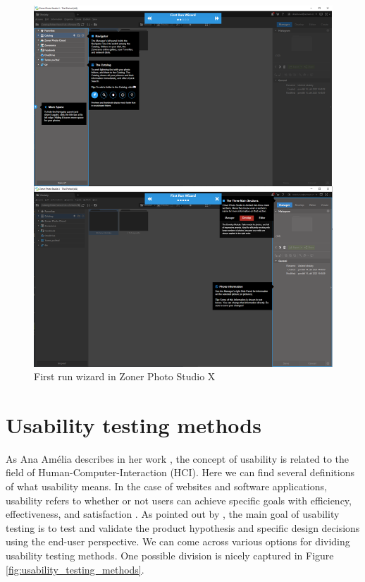 \documentclass[a4paper,10pt,twoside]{article}
\begin{document}
\vspace{0.3cm}
\begin{figure}[hbt!] 
\begin{center}
\includegraphics[width=15cm]{../pictures/zoner.png} 
\caption[First run wizard in Zoner Photo Studio X]{First run wizard in Zoner Photo Studio X}
\label{fig:zoner}
\end{center}
\end{figure}



\newpage
\vspace*{-1cm}
\section{Usability testing methods}
\label{sec:usability_testing}

\noindent As Ana Amélia describes in her work \cite{amelia}, the concept of usability is related to the field of Human-Computer-Interaction (HCI). Here we can find several definitions of what usability means. In the case of websites and software applications, usability refers to whether or not users can achieve specific goals with efficiency, effectiveness, and satisfaction \cite{dishman}. As pointed out by \cite{hotjar}, the main goal of usability testing is to test and validate the product hypothesis and specific design decisions using the end-user perspective. We can come across various options for dividing usability testing methods. One possible division is nicely captured in Figure \ref{fig:usability_testing_methods}.
\end{document}
